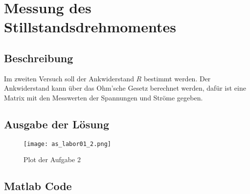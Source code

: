 \section{Messung des Stillstandsdrehmomentes}

\subsection{Beschreibung}

Im zweiten Versuch soll der Ankwiderstand $R$ bestimmt werden.
Der Ankwiderstand kann über das Ohm'sche Gesetz berechnet werden, dafür ist
eine Matrix mit den Messwerten der Spannungen und Ströme gegeben.



\subsection{Ausgabe der Lösung}
\begin{figure}[htp]
 \centering
 \texttt{[image: as\_labor01\_2.png]}
 \caption{Plot der Aufgabe 2}
 \label{fig:PlotAufgabe2}
\end{figure}

\subsection{Matlab Code}

